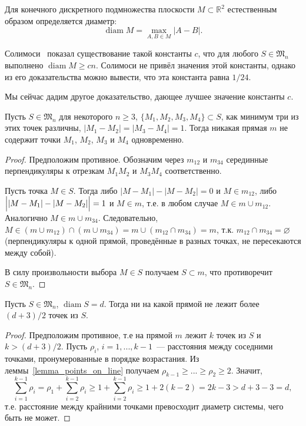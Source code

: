 Для конечного дискретного подмножества плоскости $M\subset \mathbb{R}^2$
естественным образом определяется диаметр:
\begin{equation*}
	\operatorname{diam} M = \max_{A,B\in M} |A-B|
	.
\end{equation*}

Солимоси~\cite{solymosi2003note} показал существование такой константы $c$,
что для любого $S\in\mathfrak{M}_n$ выполнено $\operatorname{diam} M \geq c n$.
Солимоси не привёл значения этой константы, однако из его доказательства можно вывести,
что эта константа равна $1/24$.

Мы сейчас дадим другое доказательство, дающее лучшее значение константы $c$.

\begin{lemma}
	\label{lemma_points_on_line}
	Пусть $S\in\mathfrak{M}_n$ для некоторого $n \geqslant 3$,
	$\{M_1, M_2, M_3, M_4\} \subset S$, как минимум три из этих точек различны,
	$|M_1 - M_2| = |M_3 - M_4| = 1$.
	Тогда никакая прямая $m$ не содержит точки $M_1$, $M_2$, $M_3$ и $M_4$ одновременно.
\end{lemma}

\begin{proof}
	Предположим противное.
	Обозначим через $m_{12}$ и $m_{34}$ серединные перпендикуляры к отрезкам $M_1 M_2$ и $M_3 M_4$ соответственно.

	Пусть точка $M\in S$.
	Тогда либо $|M - M_1| - |M - M_2| = 0$ и $M\in m_{12}$, либо $\Bigl||M - M_1| - |M - M_2|\Bigr| = 1$ и $M\in m$,
	т.е. в любом случае $M\in m \cup m_{12}$.
	Аналогично $M\in m \cup m_{34}$.
	Следовательно, $M\in (m \cup m_{12}) \cap (m \cup m_{34}) = m \cup (m_{12} \cap m_{34}) = m$,
	т.к. $m_{12} \cap m_{34} = \varnothing$ (перпендикуляры к одной прямой, проведённые в разных точках, не пересекаются между собой).

	В силу произвольности выбора $M \in S$ получаем $S \subset m$, что противоречит $S\in\mathfrak{M}_n$.
\end{proof}

\begin{corollary}
	\label{corollary:max_points_on_line}
	Пусть $S\in\mathfrak{M}_n$, $\operatorname{diam} S = d$.
	Тогда ни на какой прямой не лежит более $(d+3)/2$ точек из $S$.
\end{corollary}

\begin{proof}
	Предположим противное, т.е на прямой $m$ лежит $k$ точек из $S$ и $k > (d+3)/2$.
	Пусть $\rho_i$, $i = 1,...,k-1$~--- расстояния между соседними точками,
	пронумерованные в порядке возрастания.
	Из леммы~\ref{lemma_points_on_line} получаем $\rho_{k-1}\geq...\geq\rho_2\geq 2$.
	Значит,
	\begin{equation*}
		\sum_{i=1}^{k-1} \rho_i
		=
		\rho_1 + \sum_{i=2}^{k-1} \rho_i
		\geq
		1 + \sum_{i=2}^{k-1} \rho_i
		\geq
		1 + 2(k-2)
		=
		2k-3
		>
		d+3-3
		=
		d
		,
	\end{equation*}
	т.е. расстояние между крайними точками превосходит диаметр системы,
	чего быть не может.
\end{proof}


